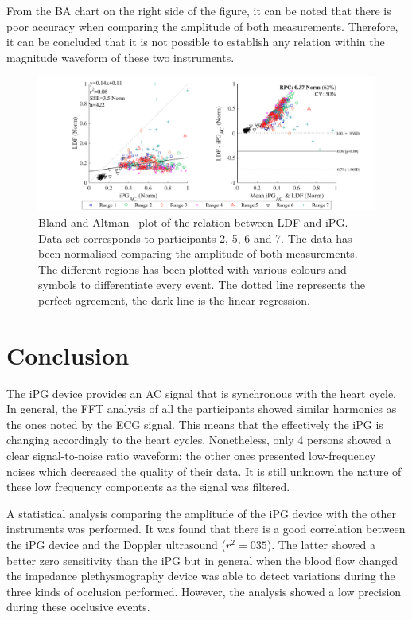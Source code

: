 From the BA chart on the right side of the figure, it can be noted that there is poor accuracy when comparing the amplitude of both measurements. Therefore, it can be concluded that it is not possible to establish any relation within the magnitude waveform of these two instruments.

\begin{figure}[!htpb]
	\includegraphics[width=1\textwidth,keepaspectratio]{figure4}    
	\caption[Bland and Altman plot of the relation between LDF and iPG]{Bland and Altman~\cite{bland1986statistical} plot of the relation between LDF and iPG. Data set corresponds to participants 2, 5, 6 and 7. The data has been normalised comparing the amplitude of both measurements. The different regions has been plotted with various colours and symbols to differentiate every event. The dotted line represents the perfect agreement, the dark line is the linear regression.}
	\label{fig:corr LDF}
\end{figure}

\section{Conclusion}  %
\label{section correlation 5}
The iPG device provides an AC signal that is synchronous with the heart cycle. In general, the FFT analysis of all the participants showed similar harmonics as the ones noted by the ECG signal. This means that the effectively the iPG is changing accordingly to the heart cycles. Nonetheless, only 4 persons showed a clear signal-to-noise ratio waveform; the other ones presented low-frequency noises which decreased the quality of their data. It is still unknown the nature of these low frequency components as the signal was filtered.

A statistical analysis comparing the amplitude of the iPG device with the other instruments was performed.  It was found that there is a good correlation between the iPG device and the Doppler ultrasound ($r^2 = 035$). The latter showed a better zero sensitivity than the iPG but in general when the blood flow changed the impedance plethysmography device was able to detect variations during the three kinds of occlusion performed.  However, the analysis showed a low precision during these occlusive events. 

